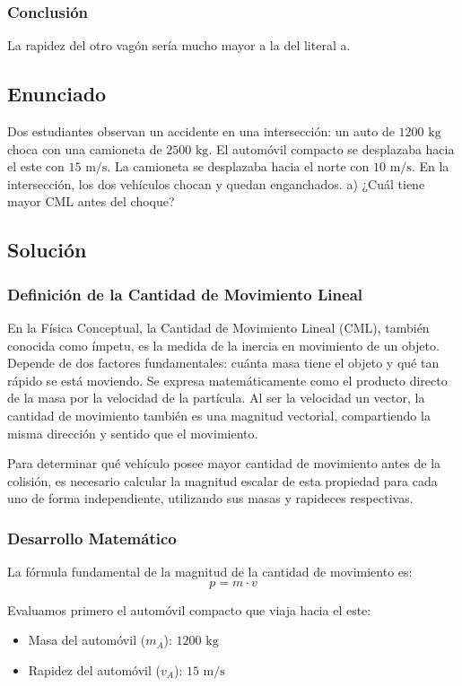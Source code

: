 \documentclass{article}
\begin{document}
\subsubsection*{Conclusión}
La rapidez del otro vagón sería mucho mayor a la del literal a.

\newpage

\subsection*{Enunciado}
Dos estudiantes observan un accidente en una intersección: un auto de $1200 \text{ kg}$ choca con una camioneta de $2500 \text{ kg}$. El automóvil compacto se desplazaba hacia el este con $15 \text{ m/s}$. La camioneta se desplazaba hacia el norte con $10 \text{ m/s}$. En la intersección, los dos vehículos chocan y quedan enganchados.
a) ¿Cuál tiene mayor CML antes del choque?

\subsection*{Solución}

\subsubsection*{Definición de la Cantidad de Movimiento Lineal}
En la Física Conceptual, la Cantidad de Movimiento Lineal (CML), también conocida como ímpetu, es la medida de la inercia en movimiento de un objeto. Depende de dos factores fundamentales: cuánta masa tiene el objeto y qué tan rápido se está moviendo. Se expresa matemáticamente como el producto directo de la masa por la velocidad de la partícula. Al ser la velocidad un vector, la cantidad de movimiento también es una magnitud vectorial, compartiendo la misma dirección y sentido que el movimiento.

Para determinar qué vehículo posee mayor cantidad de movimiento antes de la colisión, es necesario calcular la magnitud escalar de esta propiedad para cada uno de forma independiente, utilizando sus masas y rapideces respectivas.

\subsubsection*{Desarrollo Matemático}
La fórmula fundamental de la magnitud de la cantidad de movimiento es:
$$p = m \cdot v$$

Evaluamos primero el automóvil compacto que viaja hacia el este:
\begin{itemize}
    \item Masa del automóvil ($m_A$): $1200 \text{ kg}$
    \item Rapidez del automóvil ($v_A$): $15 \text{ m/s}$
\end{itemize}
\end{document}
